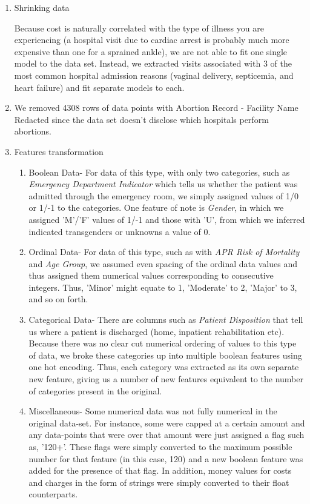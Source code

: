 \documentclass[letterpaper,11pt]{article}
\begin{document}
\begin{enumerate}
 
  \item Shrinking data
  
  Because cost is naturally correlated with the type of illness you are experiencing (a hospital visit due to cardiac arrest is probably much more expensive than one for a sprained ankle), we are not able to fit one single model to the data set. Instead, we extracted visits associated with 3 of the most common hospital admission reasons (vaginal delivery, septicemia, and heart failure) and fit separate models to each. 
  
  \item We removed 4308 rows of data points with Abortion Record - Facility Name Redacted since the data set doesn't disclose which hospitals perform abortions. 
  
  \item Features transformation
  	\begin{enumerate}
  	\item Boolean Data- For data of this type, with only two categories, such as \textit{Emergency Department Indicator} which tells us whether the patient was admitted through the emergency room, we simply assigned values of 1/0 or 1/-1 to the categories. One feature of note is \textit{Gender}, in which we assigned 'M'/'F' values of 1/-1 and those with 'U', from which we inferred indicated transgenders or unknowns a value of 0. 
    
    \item Ordinal Data- For data of this type, such as with \textit{APR Risk of Mortality} and \textit{Age Group}, we assumed even spacing of the ordinal data values and thus assigned them numerical values corresponding to consecutive integers. Thus, 'Minor' might equate to 1, 'Moderate' to 2, 'Major' to 3, and so on forth. 
    
    \item Categorical Data- There are columns such as \textit{Patient Disposition} that tell us where a patient is discharged (home, inpatient rehabilitation etc). Because there was no clear cut numerical ordering of values to this type of data, we broke these categories up into multiple boolean features using one hot encoding. Thus, each category was extracted as its own separate new feature, giving us a number of new features equivalent to the number of categories present in the original. 
    
    \item Miscellaneous- Some numerical data was not fully numerical in the original data-set. For instance, some were capped at a certain amount and any data-points that were over that amount were just assigned a flag such as, '120+'. These flags were simply converted to the maximum possible number for that feature (in this case, 120) and a new boolean feature was added for the presence of that flag. In addition, money values for costs and charges in the form of strings were simply converted to their float counterparts.
  	\end{enumerate}
  

\end{enumerate}
\end{document}
